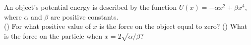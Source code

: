 An object's potential energy is described by the function $U(x) =
-\alpha x^2 + \beta x^4$, where $\alpha$ and $\beta$ are positive
constants.\\
%
() For what positive value of $x$ is the force on the object equal to
zero?\answercheck\hwendpart
%
() What is the force on the particle when $x = 2\sqrt{\alpha/\beta}$?\answercheck
